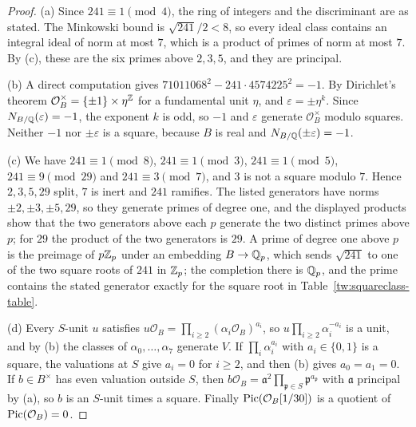 \begin{proof}
(a) Since $241\equiv1\pmod 4$, the ring of integers and the discriminant are
as stated. The Minkowski bound is $\sqrt{241}/2<8$, so every ideal class
contains an integral ideal of norm at most $7$, which is a product of primes
of norm at most $7$. By (c), these are the six primes above $2,3,5$, and they
are principal.

(b) A direct computation gives $71011068^2-241\cdot4574225^2=-1$. By
Dirichlet's theorem $\mathcal O_B^\times=\{\pm1\}\times\eta^{\mathbb Z}$ for a
fundamental unit $\eta$, and $\varepsilon=\pm\eta^k$. Since
$N_{B/\mathbb Q}(\varepsilon)=-1$, the exponent $k$ is odd, so $-1$ and
$\varepsilon$ generate $\mathcal O_B^\times$ modulo squares. Neither $-1$ nor
$\pm\varepsilon$ is a square, because $B$ is real and
$N_{B/\mathbb Q}(\pm\varepsilon)=-1$.

(c) We have $241\equiv1\pmod8$, $241\equiv1\pmod3$, $241\equiv1\pmod5$,
$241\equiv9\pmod{29}$ and $241\equiv3\pmod7$, and $3$ is not a square modulo
$7$. Hence $2,3,5,29$ split, $7$ is inert and $241$ ramifies. The listed
generators have norms $\pm2,\pm3,\pm5,29$, so they generate primes of degree
one, and the displayed products show that the two generators above each $p$
generate the two distinct primes above $p$; for $29$ the product of the two
generators is $29$. A prime of degree one above $p$ is the preimage of
$p\mathbb Z_p$ under an embedding $B\to\mathbb Q_p$, which sends $\sqrt{241}$ to one of
the two square roots of $241$ in $\mathbb Z_p$; the completion there is $\mathbb Q_p$, and
the prime contains the stated generator exactly for the square root in
Table~\ref{tw:squareclass-table}.

(d) Every $S$-unit $u$ satisfies
$u\mathcal O_B=\prod_{i\ge2}(\alpha_i\mathcal O_B)^{a_i}$, so
$u\prod_{i\ge2}\alpha_i^{-a_i}$ is a unit, and by (b) the classes of
$\alpha_0,\dots,\alpha_7$ generate $V$. If $\prod_i\alpha_i^{a_i}$ with
$a_i\in\{0,1\}$ is a square, the valuations at $S$ give $a_i=0$ for $i\ge2$,
and then (b) gives $a_0=a_1=0$. If $b\in B^\times$ has even valuation outside
$S$, then
$b\mathcal O_B=\mathfrak a^2\prod_{\mathfrak p\in S}\mathfrak p^{a_{\mathfrak p}}$
with $\mathfrak a$ principal by (a), so $b$ is an $S$-unit times a square.
Finally $\operatorname{Pic}(\mathcal O_B[1/30])$ is a quotient of $\operatorname{Pic}(\mathcal O_B)=0$.
\end{proof}

